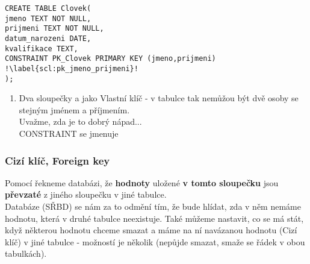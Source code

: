 \vspace{1cm}
\begin{minipage}[t]{.45\textwidth}
\begin{code}
\begin{verbatim}
CREATE TABLE Clovek( 
jmeno TEXT NOT NULL,
prijmeni TEXT NOT NULL,
datum_narozeni DATE,
kvalifikace TEXT,
CONSTRAINT PK_Clovek PRIMARY KEY (jmeno,prijmeni) !\label{scl:pk_jmeno_prijmeni}!
);
\end{verbatim}
\label{code:primary_key_jmeno_prijmeni}
\end{code}
\end{minipage}
\begin{minipage}[t]{.45\textwidth}
\begin{enumerate}
\vspace{-1cm}
\item[ř. \ref{scl:pk_jmeno_prijmeni}:]	Dva sloupečky  a  jako Vlastní klíč - v tabulce tak nemůžou být dvě osoby se stejným jménem a příjmením.\\Uvažme, zda je to dobrý nápad...\\
CONSTRAINT se jmenuje 
\end{enumerate} 
\end{minipage}

\subsubsection{Cizí klíč, Foreign key}
Pomocí  řekneme databázi, že \textbf{hodnoty} uložené \textbf{v tomto sloupečku} jsou \textbf{převzaté} z jiného sloupečku v jiné tabulce.\\
Databáze (SŘBD) se nám za to odmění tím, že bude hlídat, zda v něm nemáme hodnotu, která v druhé tabulce neexistuje. Také můžeme nastavit, co se má stát, když některou hodnotu chceme smazat a máme na ní navázanou hodnotu (Cizí klíč) v jiné tabulce - možností je několik (nepůjde smazat, smaže se řádek v obou tabulkách).

